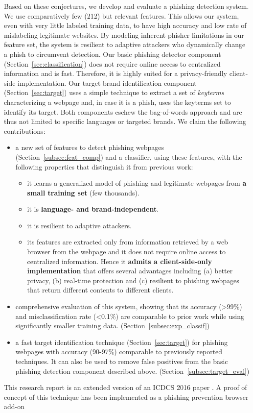 \documentclass[10pt,conference,compsocconf,letterpaper]{IEEEtran}
\begin{document}
Based on these conjectures, we develop and evaluate a phishing detection system. We use comparatively few (212) but relevant features. This allows our system, even with very little labeled training data, to have high accuracy and low rate of mislabeling legitimate websites. By modeling inherent phisher limitations in our feature set, the system is resilient to adaptive attackers who dynamically change a phish to circumvent detection.  
Our basic phishing detector component
(Section~\ref{sec:classification}) does not require online access to
centralized information and is fast. Therefore, it is highly suited
for a privacy-friendly client-side implementation. Our target brand
identification component (Section~\ref{sec:target}) uses a simple
technique to extract a set of \emph{keyterms} characterizing a webpage
and, in case it is a phish, uses the keyterms set to identify its
target. Both components eschew the bag-of-words approach and are thus
not limited to specific languages or targeted brands.
\newpage
We claim the following contributions:

\begin{itemize}
\item a new set of features to detect phishing webpages (Section~\ref{subsec:feat_comp}) and a classifier, using these features, with the following properties that distinguish it from previous work:
          \begin{itemize}
          \item it learns a generalized model of phishing and legitimate webpages from \textbf{a small training set} (few thousands).
          \item it is \textbf{language- and brand-independent}.
          \item it is resilient to adaptive attackers.
          \item its features are extracted only from information retrieved by a web browser from the webpage and it does not require online access to centralized information. Hence it \textbf{admits a client-side-only implementation} that offers several advantages including (a) better privacy, (b) real-time protection and (c) resilient to phishing webpages that return different contents to different clients.
\end{itemize} 
        \item comprehensive evaluation of this system, showing that its accuracy (\textgreater 99\%) and misclassification rate (\textless 0.1\%) are comparable to prior work while using significantly smaller training data. (Section~\ref{subsec:exp_classif}) 
	\item a fast target identification technique (Section~\ref{sec:target}) for phishing webpages with accuracy (90-97\%) comparable to previously reported techniques. It can also be used to remove false positives from the basic phishing detection component described above.  (Section~\ref{subsec:target_eval})
\end{itemize}
\iffullversion
This research report is an extended version of an ICDCS 2016 paper \cite{marchal:2016:know}. A proof of concept of this technique has been implemented as a phishing prevention browser add-on \cite{armano:2016:real}  
\fi
\end{document}
